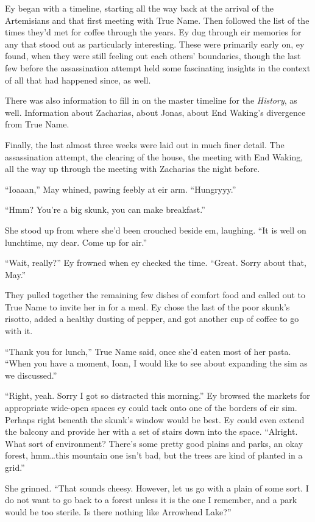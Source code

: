 Ey began with a timeline, starting all the way back at the arrival of the Artemisians and that first meeting with True Name. Then followed the list of the times they'd met for coffee through the years. Ey dug through eir memories for any that stood out as particularly interesting. These were primarily early on, ey found, when they were still feeling out each others' boundaries, though the last few before the assassination attempt held some fascinating insights in the context of all that had happened since, as well.

There was also information to fill in on the master timeline for the \emph{History}, as well. Information about Zacharias, about Jonas, about End Waking's divergence from True Name.

Finally, the last almost three weeks were laid out in much finer detail. The assassination attempt, the clearing of the house, the meeting with End Waking, all the way up through the meeting with Zacharias the night before.

``Ioaaan,'' May whined, pawing feebly at eir arm. ``Hungryyy.''

``Hmm? You're a big skunk, you can make breakfast.''

She stood up from where she'd been crouched beside em, laughing. ``It is well on lunchtime, my dear. Come up for air.''

``Wait, really?'' Ey frowned when ey checked the time. ``Great. Sorry about that, May.''

They pulled together the remaining few dishes of comfort food and called out to True Name to invite her in for a meal. Ey chose the last of the poor skunk's risotto, added a healthy dusting of pepper, and got another cup of coffee to go with it.

``Thank you for lunch,'' True Name said, once she'd eaten most of her pasta. ``When you have a moment, Ioan, I would like to see about expanding the sim as we discussed.''

``Right, yeah. Sorry I got so distracted this morning.'' Ey browsed the markets for appropriate wide-open spaces ey could tack onto one of the borders of eir sim. Perhaps right beneath the skunk's window would be best. Ey could even extend the balcony and provide her with a set of stairs down into the space. ``Alright. What sort of environment? There's some pretty good plains and parks, an okay forest, hmm\ldots this mountain one isn't bad, but the trees are kind of planted in a grid.''

She grinned. ``That sounds cheesy. However, let us go with a plain of some sort. I do not want to go back to a forest unless it is the one I remember, and a park would be too sterile. Is there nothing like Arrowhead Lake?''

